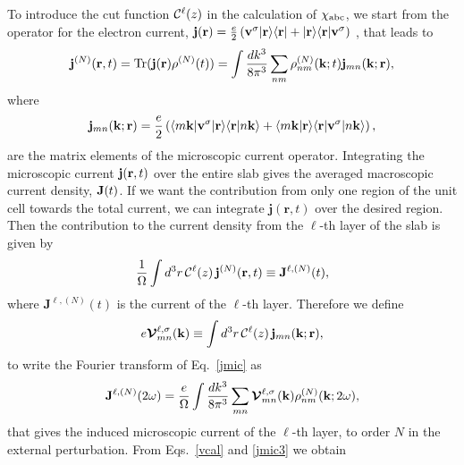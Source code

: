 \documentclass[floatfix,prb,aps,superscriptaddress,11pt,preprint,letterpaper]{revtex4}
\def\chon{black}
\begin{document}
To introduce the
cut function ${\mathbf{\cal C}}^\ell(z)$ in
the calculation of $\chi_{\mathrm{a}\mathrm{b}\mathrm{c}}$, we start from 
the operator for the electron current,
$\mathbf{j}(\mathbf{r})=\frac{e}{2}\left(\mathbf{v}^\sigma| \mathbf{r} \rangle\langle \mathbf{r} |
+| \mathbf{r} \rangle\langle \mathbf{r} |\mathbf{v}^\sigma\right)${\color{\chon} , that} leads to
\begin{align}\label{jmic}
\mathbf{j}^{(N)}(\mathbf{r},t)=\mathrm{Tr}(\mathbf{j}(\mathbf{r})\rho^{(N)}(t))
=
\int \frac{dk^3}{8\pi^3}
\sum_{nm}
\rho^{(N)}_{nm}(\mathbf{k};t)\mathbf{j}_{mn}(\mathbf{k};\mathbf{r})
,
\end{align}
where 
\begin{equation}\label{jmic3}
\mathbf{j}_{mn}(\mathbf{k};\mathbf{r})=
\frac{e}{2}
\left(
\langle m\mathbf{k} |\mathbf{v}^\sigma| \mathbf{r} \rangle\langle {\mathbf{r}} | {n\mathbf{k}} \rangle
+
\langle {m\mathbf{k}} | {\mathbf{r}} \rangle\langle \mathbf{r} |\mathbf{v}^\sigma| n\mathbf{k} \rangle
\right),
\end{equation}
are the matrix elements of the microscopic current operator.
Integrating the microscopic current $\mathbf{j}(\mathbf{r},t)$ over
the entire slab gives the averaged macroscopic current density, $\mathbf{J}(t)$. 
If we want the contribution from only one region of the unit cell 
{\color{\chon} towards} the total current, we can integrate $\mathbf{j}({\mathbf r},t)$ 
over the desired region. {\color{\chon} Then the} contribution 
to the current density from the
$\ell$-th layer of the slab is given by
\begin{equation}\label{jsz}
\frac{1}{\Omega}\int d^3r\, {\mathbf{\cal C}}^\ell(z)\, \mathbf{j}^{(N)}(\mathbf{r},t)
 \equiv \mathbf{J}^{\ell,(N)}(t),
\end{equation}
where $\mathbf{J}^{\ell,(N)}(t)$ is the current of the
$\ell$-th layer.
Therefore we define
\begin{equation}\label{vcal}
e{\boldsymbol{\mathcal{V}}}^{\ell,\sigma}_{mn}(\mathbf{k})
\equiv
\int d^3r\, {\mathbf{\cal C}}^\ell(z)\,\mathbf{j}_{mn}({\mathbf{k}};\mathbf{r}),
\end{equation}
to write the Fourier transform of Eq.~\eqref{jmic} as
\begin{equation}\label{jmac2}
\mathbf{J}^{\ell,(N)}(2\omega)=\frac{e}{\Omega}
\int \frac{dk^3}{8\pi^3}
\sum_{mn}
\boldsymbol{\mathcal{\cal V}}^{\ell,\sigma}_{mn}(\mathbf{k}) 
\rho^{(N)}_{nm}(\mathbf{k};2\omega) 
, 
\end{equation}
that gives the induced microscopic current of the $\ell$-th layer, to order $N$ 
in the external perturbation. 
From
Eqs.~\eqref{vcal} and \eqref{jmic3} we obtain
\end{document}
